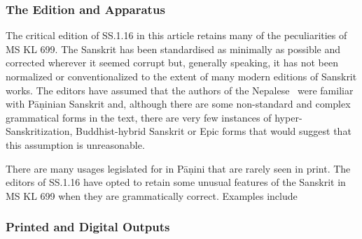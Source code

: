 \subsubsection{The Edition and Apparatus}
The critical edition of SS.1.16 in this article retains many of the peculiarities of MS KL 699. The Sanskrit has been standardised as minimally as possible and corrected wherever it seemed corrupt but, generally speaking, it has not been normalized or conventionalized to the extent of many modern editions of Sanskrit works. The editors have assumed that the authors of the Nepalese \SS\ were familiar with Pāṇinian Sanskrit and, although there are some non-standard and complex grammatical forms in the text, there are very few instances of hyper-Sanskritization, Buddhist-hybrid Sanskrit or Epic forms that would suggest that this assumption is unreasonable. 

There are many usages legislated for in Pāṇini that are rarely seen in print. The editors of SS.1.16 have opted to retain some unusual features of the Sanskrit in MS KL 699 when they are grammatically correct. Examples include 





\subsubsection{Printed and Digital Outputs}



